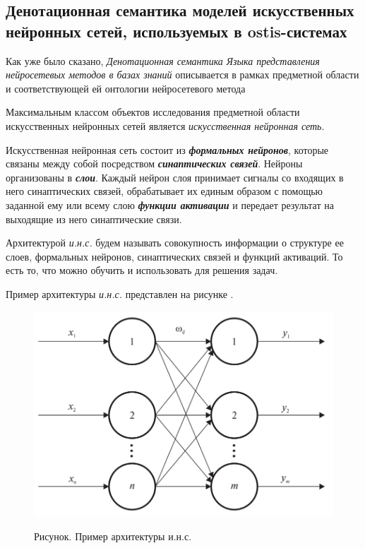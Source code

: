 \subsection{Денотационная семантика моделей искусственных нейронных сетей, используемых в ostis-системах}
\label{subsec_ann_denot}

Как уже было сказано, \textit{Денотационная семантика Языка представления нейросетевых методов в базах знаний} описывается в рамках предметной области и соответствующей ей онтологии нейросетевого метода

Максимальным классом объектов исследования предметной области искусственных нейронных сетей является \textit{искусственная нейронная сеть}.

\begin{SCn}
\end{SCn}

Искусственная нейронная сеть состоит из \textbf{\textit{формальных нейронов}}, которые связаны между собой посредством \textbf{\textit{синаптических связей}}. Нейроны организованы в \textbf{\textit{слои}}. Каждый нейрон слоя принимает сигналы со входящих в него синаптических связей, обрабатывает их единым образом с помощью заданной ему или всему слою \textbf{\textit{функции активации}} и передает результат на выходящие из него синаптические связи.

Архитектурой \textit{и.н.с.} будем называть совокупность информации о структуре ее слоев, формальных нейронов, синаптических связей и функций активаций. То есть то, что можно обучить и использовать для решения задач.

Пример архитектуры \textit{и.н.с.} представлен на рисунке \textit{}.

\begin{figure}[H]
	\caption{Рисунок. Пример архитектуры и.н.с.}
	\includegraphics[scale=0.3]{author/part3/figures/neural_network.png}
	\label{fig:nn_example}
\end{figure}

